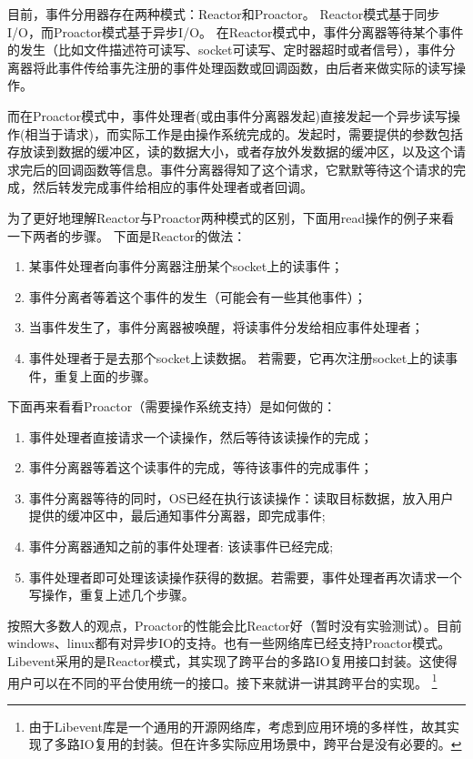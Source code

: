 \documentclass[11pt,a4paper]{article}
\newcommand*{\heiti}{\CJKfamily{zhhei}} %
\begin{document}
目前，事件分用器存在两种模式：Reactor和Proactor。 Reactor模式基于同步I/O，而Proactor模式基于异步I/O。 在Reactor模式中，事件分离器等待某个事件的发生（比如文件描述符可读写、socket可读写、定时器超时或者信号），事件分离器将此事件传给事先注册的事件处理函数或回调函数，由后者来做实际的读写操作。

而在Proactor模式中，事件处理者(或由事件分离器发起)直接发起一个异步读写操作(相当于请求)，而实际工作是由操作系统完成的。发起时，需要提供的参数包括存放读到数据的缓冲区，读的数据大小，或者存放外发数据的缓冲区，以及这个请求完后的回调函数等信息。事件分离器得知了这个请求，它默默等待这个请求的完成，然后转发{\heiti 完成事件}给相应的事件处理者或者回调。

为了更好地理解Reactor与Proactor两种模式的区别，下面用read操作的例子来看一下两者的步骤。
下面是Reactor的做法：
\begin{enumerate}
\item 某事件处理者向事件分离器注册某个socket上的读事件；
\item 事件分离者等着这个事件的发生（可能会有一些其他事件）；
\item 当事件发生了，事件分离器被唤醒，将读事件分发给相应事件处理者；
\item 事件处理者于是去那个socket上读数据。 若需要，它再次注册socket上的读事件，重复上面的步骤。
\end{enumerate}

下面再来看看Proactor（需要操作系统支持）是如何做的：
\begin{enumerate}
\item 事件处理者直接请求一个读操作，然后等待该读操作的完成；
\item 事件分离器等着这个读事件的完成，等待该事件的完成事件；
\item 事件分离器等待的同时，OS已经在执行该读操作：读取目标数据，放入用户提供的缓冲区中，最后通知事件分离器，即完成事件;
\item 事件分离器通知之前的事件处理者: 该读事件已经完成;
\item 事件处理者即可处理该读操作获得的数据。若需要，事件处理者再次请求一个写操作，重复上述几个步骤。
\end{enumerate}

按照大多数人的观点，Proactor的性能会比Reactor好（暂时没有实验测试）。目前windows、linux都有对异步IO的支持。也有一些网络库已经支持Proactor模式。Libevent采用的是Reactor模式，其实现了跨平台的多路IO复用接口封装。这使得用户可以在不同的平台使用统一的接口。接下来就讲一讲其跨平台的实现。
\footnote{由于Libevent库是一个通用的开源网络库，考虑到应用环境的多样性，故其实现了多路IO复用的封装。但在许多实际应用场景中，跨平台是没有必要的。}
\end{document}
